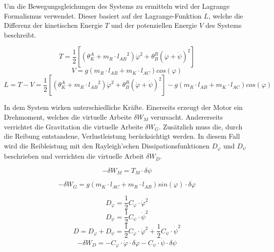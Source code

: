 \newpage
Um die Bewegungsgleichungen des Systems zu ermitteln wird der Lagrange Formalismus verwendet. Dieser basiert auf der Lagrange-Funktion $L$, welche die Differenz der kinetischen Energie $T$ und der potenziellen Energie $V$ des Systems beschreibt.

\begin{equation}
T = \frac{1}{2}[({\theta}^A_K + m_R \cdot {l_{AB}}^2) {\dot{\varphi}}^2 + {\theta}^R_B(\dot{\varphi}+\dot{\psi})^2]
\end{equation}
\begin{equation}
V = g(m_R \cdot l_{AB} + m_K \cdot l_{AC})cos(\varphi)
\end{equation}
\begin{equation}
L = T - V = \frac{1}{2}[({\theta}^A_K + m_R \cdot {l_{AB}}^2) {\dot{\varphi}}^2 + {\theta}^R_B(\dot{\varphi}+\dot{\psi})^2] - g(m_R \cdot l_{AB} + m_K \cdot l_{AC})cos(\varphi)
\end{equation}

In dem System wirken unterschiedliche Kräfte. Einerseits erzeugt der Motor ein Drehmoment, welches die virtuelle Arbeite $\delta W_M$ verursacht. Andererseits verrichtet die Gravitation die virtuelle Arbeite $\delta W_G$. Zusätzlich muss die, durch die Reibung entstandene, Verlustleistung berücksichtigt werden. In diesem Fall wird die Reibleistung mit den Rayleigh'schen Dissipationsfunktionen $D_{\varphi}$ und $D_{\psi}$ beschrieben und verrichten die virtuelle Arbeit $\delta W_D$.

\begin{equation}
-\delta W_M = T_M \cdot \delta \psi
\end{equation}

\begin{equation}
-\delta W_G = g(m_K \cdot l_{AC} + m_R \cdot l_{AB})sin(\varphi) \cdot \delta \varphi
\end{equation}

\begin{equation}
D_{\varphi} = \frac{1}{2}C_{\varphi} \cdot {\dot{\varphi}}^2
\end{equation}
\begin{equation}
D_{\psi} = \frac{1}{2}C_{\psi} \cdot {\dot{\psi}}^2
\end{equation}
\begin{equation}
D = D_{\varphi} + D_{\psi} = \frac{1}{2}C_{\varphi} \cdot {\dot{\varphi}}^2 + \frac{1}{2}C_{\psi} \cdot {\dot{\psi}}^2
\end{equation}
\begin{equation}
-\delta W_D = - C_{\varphi} \cdot \dot{\varphi} \cdot \delta \varphi - C_{\psi} \cdot \dot{\psi} \cdot \delta \psi
\end{equation}

